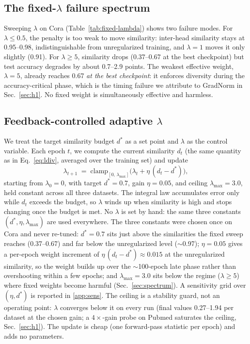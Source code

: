 \documentclass{ws-ijprai}
\begin{document}
\subsection{The fixed-$\lambda$ failure spectrum}

Sweeping $\lambda$ on Cora (Table~\ref{tab:fixed-lambda}) shows two failure
modes. For $\lambda \le 0.5$, the penalty is too weak to move similarity:
inter-head similarity stays at 0.95--0.98, indistinguishable from
unregularized training, and $\lambda=1$ moves it only slightly (0.91). For
$\lambda \ge 5$, similarity drops (0.37--0.67 at
the best checkpoint) but test accuracy degrades by about 0.7--2.9 points. The
weakest effective weight, $\lambda=5$, already reaches 0.67 \emph{at the best
checkpoint}: it enforces diversity during the accuracy-critical phase,
which is the timing failure we attribute to GradNorm in
Sec.~\ref{sec:h1}. No fixed weight is simultaneously effective and harmless.

\subsection{Feedback-controlled adaptive $\lambda$}

We treat the target similarity budget $d^*$ as a set point and $\lambda$ as the
control variable. Each epoch $t$, we compute the current similarity $d_t$ (the
same quantity as in Eq.~\eqref{eq:ldiv}, averaged over the training set) and
update
\begin{equation}
\lambda_{t+1} \;=\; \mathrm{clamp}_{[0,\,\lambda_{\max}]}\!\big(\lambda_t +
\eta\,(d_t - d^*)\big),
\label{eq:control}
\end{equation}
starting from $\lambda_0 = 0$, with target $d^* = 0.7$, gain $\eta = 0.05$, and
ceiling $\lambda_{\max} = 3.0$, held constant across all three datasets. The
integral law accumulates error only while $d_t$ exceeds the budget, so
$\lambda$ winds up when similarity is high and stops changing once the budget
is met. No $\lambda$ is set by hand: the same three constants
$(d^*, \eta, \lambda_{\max})$ are used everywhere. The three constants were
chosen once on Cora and never re-tuned: $d^*=0.7$ sits just above the
similarities the fixed sweep reaches (0.37--0.67) and far below the
unregularized level ($\sim$0.97); $\eta=0.05$ gives a per-epoch weight
increment of $\eta\,(d_t-d^*) \approx 0.015$ at the unregularized similarity,
so the weight builds up over the $\sim$100-epoch late phase rather than
overshooting within a few epochs; and $\lambda_{\max}=3.0$ sits below the
regime ($\lambda \ge 5$) where fixed weights become harmful
(Sec.~\ref{sec:spectrum}). A sensitivity grid over $(\eta, d^*)$ is reported
in \ref{app:sens}. The ceiling is a stability
guard, not an operating point: $\lambda$ converges below it on every run
(final values 0.27--1.94 per dataset at the chosen gain; a $4\times$-gain
probe on Pubmed saturates the ceiling, Sec.~\ref{sec:h1}). The update is cheap (one
forward-pass statistic per epoch) and adds no parameters.
\end{document}

